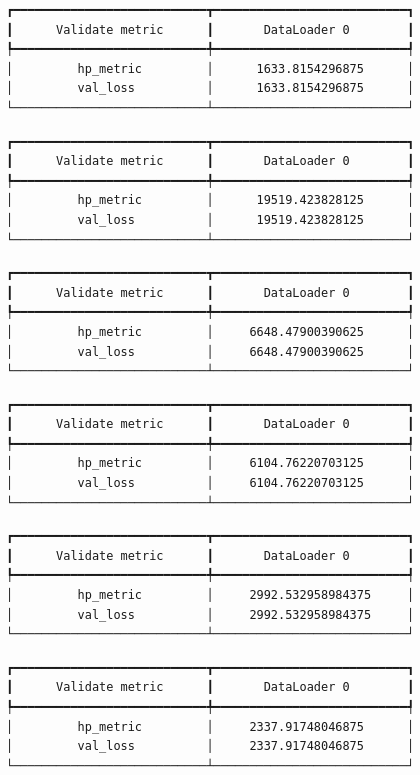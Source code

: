 \documentclass[
  letterpaper,
  DIV=11,
  numbers=noendperiod]{scrreprt}
\begin{document}
\begin{verbatim}
┏━━━━━━━━━━━━━━━━━━━━━━━━━━━┳━━━━━━━━━━━━━━━━━━━━━━━━━━━┓
┃      Validate metric      ┃       DataLoader 0        ┃
┡━━━━━━━━━━━━━━━━━━━━━━━━━━━╇━━━━━━━━━━━━━━━━━━━━━━━━━━━┩
│         hp_metric         │      1633.8154296875      │
│         val_loss          │      1633.8154296875      │
└───────────────────────────┴───────────────────────────┘
\end{verbatim}

\begin{verbatim}
┏━━━━━━━━━━━━━━━━━━━━━━━━━━━┳━━━━━━━━━━━━━━━━━━━━━━━━━━━┓
┃      Validate metric      ┃       DataLoader 0        ┃
┡━━━━━━━━━━━━━━━━━━━━━━━━━━━╇━━━━━━━━━━━━━━━━━━━━━━━━━━━┩
│         hp_metric         │      19519.423828125      │
│         val_loss          │      19519.423828125      │
└───────────────────────────┴───────────────────────────┘
\end{verbatim}

\begin{verbatim}
┏━━━━━━━━━━━━━━━━━━━━━━━━━━━┳━━━━━━━━━━━━━━━━━━━━━━━━━━━┓
┃      Validate metric      ┃       DataLoader 0        ┃
┡━━━━━━━━━━━━━━━━━━━━━━━━━━━╇━━━━━━━━━━━━━━━━━━━━━━━━━━━┩
│         hp_metric         │     6648.47900390625      │
│         val_loss          │     6648.47900390625      │
└───────────────────────────┴───────────────────────────┘
\end{verbatim}

\begin{verbatim}
┏━━━━━━━━━━━━━━━━━━━━━━━━━━━┳━━━━━━━━━━━━━━━━━━━━━━━━━━━┓
┃      Validate metric      ┃       DataLoader 0        ┃
┡━━━━━━━━━━━━━━━━━━━━━━━━━━━╇━━━━━━━━━━━━━━━━━━━━━━━━━━━┩
│         hp_metric         │     6104.76220703125      │
│         val_loss          │     6104.76220703125      │
└───────────────────────────┴───────────────────────────┘
\end{verbatim}

\begin{verbatim}
┏━━━━━━━━━━━━━━━━━━━━━━━━━━━┳━━━━━━━━━━━━━━━━━━━━━━━━━━━┓
┃      Validate metric      ┃       DataLoader 0        ┃
┡━━━━━━━━━━━━━━━━━━━━━━━━━━━╇━━━━━━━━━━━━━━━━━━━━━━━━━━━┩
│         hp_metric         │     2992.532958984375     │
│         val_loss          │     2992.532958984375     │
└───────────────────────────┴───────────────────────────┘
\end{verbatim}

\begin{verbatim}
┏━━━━━━━━━━━━━━━━━━━━━━━━━━━┳━━━━━━━━━━━━━━━━━━━━━━━━━━━┓
┃      Validate metric      ┃       DataLoader 0        ┃
┡━━━━━━━━━━━━━━━━━━━━━━━━━━━╇━━━━━━━━━━━━━━━━━━━━━━━━━━━┩
│         hp_metric         │     2337.91748046875      │
│         val_loss          │     2337.91748046875      │
└───────────────────────────┴───────────────────────────┘
\end{verbatim}
\end{document}
